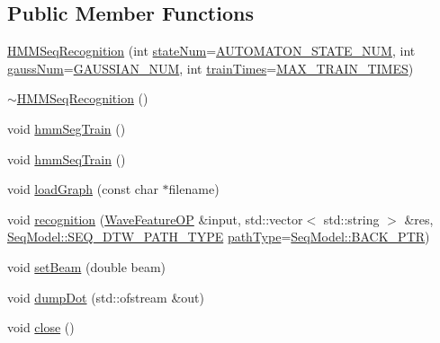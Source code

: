 \subsection*{Public Member Functions}
\begin{DoxyCompactItemize}
\item 
\hyperlink{class_h_m_m_seq_recognition_ad31375206b98b00a23053eafc6fa4acb}{H\+M\+M\+Seq\+Recognition} (int \hyperlink{class_h_m_m_recognition_ac9be31139899e7e69694de527d229fd8}{state\+Num}=\hyperlink{configure__hmm_8h_aa9cc71cb42394379957677c761aae79e}{A\+U\+T\+O\+M\+A\+T\+O\+N\+\_\+\+S\+T\+A\+T\+E\+\_\+\+N\+U\+M}, int \hyperlink{class_h_m_m_recognition_af01765163d9d0092534231a20183b0e2}{gauss\+Num}=\hyperlink{configure__hmm_8h_a8f9db0624fff0b17f641785bb8d66a82}{G\+A\+U\+S\+S\+I\+A\+N\+\_\+\+N\+U\+M}, int \hyperlink{class_h_m_m_recognition_ad7bbe647d17214ad2b0de893bc03a8d5}{train\+Times}=\hyperlink{configure__hmm_8h_a52e22519b5a37e58632e9183d5197b86}{M\+A\+X\+\_\+\+T\+R\+A\+I\+N\+\_\+\+T\+I\+M\+E\+S})
\item 
\hyperlink{class_h_m_m_seq_recognition_a8a140fd37bc6136e736e4a18af468c24}{$\sim$\+H\+M\+M\+Seq\+Recognition} ()
\item 
void \hyperlink{class_h_m_m_seq_recognition_aa7fde29aff2eedb94bb348286e81755e}{hmm\+Seg\+Train} ()
\item 
void \hyperlink{class_h_m_m_seq_recognition_a4aacbb864b59fab32a5179b29d5dc697}{hmm\+Seq\+Train} ()
\item 
void \hyperlink{class_h_m_m_seq_recognition_a6f9d60d3b76b0206908d2d3489c7a74f}{load\+Graph} (const char $\ast$filename)
\item 
void \hyperlink{class_h_m_m_seq_recognition_a6d1e4941efc0412cc91e64598786163b}{recognition} (\hyperlink{class_wave_feature_o_p}{Wave\+Feature\+O\+P} \&input, std\+::vector$<$ std\+::string $>$ \&res, \hyperlink{class_seq_model_a145b769692f03811a15c5289fe77da42}{Seq\+Model\+::\+S\+E\+Q\+\_\+\+D\+T\+W\+\_\+\+P\+A\+T\+H\+\_\+\+T\+Y\+P\+E} \hyperlink{pro6__demo_8cpp_a3741bb1053b40df849a053be5cca6a7a}{path\+Type}=\hyperlink{class_seq_model_a145b769692f03811a15c5289fe77da42a4e15f646c0c498e155c24f183dbfb6fb}{Seq\+Model\+::\+B\+A\+C\+K\+\_\+\+P\+T\+R})
\item 
void \hyperlink{class_h_m_m_seq_recognition_a9b318a686915464ebdc29ff3beff846e}{set\+Beam} (double beam)
\item 
void \hyperlink{class_h_m_m_seq_recognition_a41681a169988cb857642fcabdf0ecf1d}{dump\+Dot} (std\+::ofstream \&out)
\item 
void \hyperlink{class_h_m_m_seq_recognition_aab6f8979a62075758b12cb097f3dc03a}{close} ()
\end{DoxyCompactItemize}
